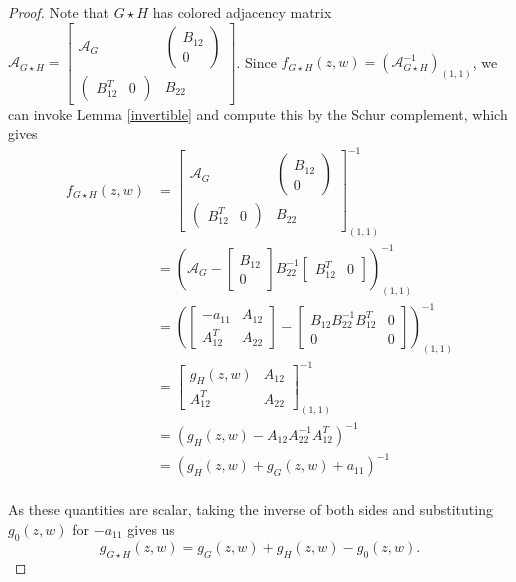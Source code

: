 \documentclass[12pt]{amsart}
\theoremstyle{remark}
\newcommand{\inv}{^{-1}}
\numberwithin{equation}{section}
\newcommand{\cA}{\mathcal{A}}
\begin{document}
\begin{proof}
Note that $G \star H$ has colored adjacency matrix
$\cA_{G \star H} = \begin{bmatrix}
    \cA_G &\begin{pmatrix}
    B_{12}\\
    0
    \end{pmatrix} \\
    \begin{pmatrix}
    B_{12}^T &
    0
    \end{pmatrix} & B_{22}
\end{bmatrix}$.  Since $f_{G \star H}(z,w) = (\cA_{G \star H}^{-1})_{(1,1)}$, we can invoke Lemma \ref{invertible} and compute this by the Schur complement, which gives
\begin{align*}
     f_{G \star H}(z,w)  &= \begin{bmatrix}
    \cA_G &\begin{pmatrix}
    B_{12}\\
    0
    \end{pmatrix} \\
    \begin{pmatrix}
    B_{12}^T &
    0
    \end{pmatrix} & B_{22}
\end{bmatrix}\inv_{(1,1)} \\
&=\left(\cA_G - \begin{bmatrix}
    B_{12}\\0
\end{bmatrix}B_{22}^{-1}\begin{bmatrix}
    B_{12}^T & 0
\end{bmatrix}\right)^{-1}_{(1,1)} \\
&= \left(\begin{bmatrix}
-a_{11} & A_{12} \\
A_{12}^T & A_{22} 
\end{bmatrix} - 
\begin{bmatrix}
    B_{12}B_{22}^{-1}B_{12}^T & 0 \\
    0 & 0
\end{bmatrix}\right)^{-1}_{(1,1)} \\
&= \begin{bmatrix}
     g_{H}(z,w) & A_{12}\\
    A_{12}^T & A_{22}
\end{bmatrix}^{-1}_{(1,1)}\\
&= (g_{H}(z,w) - A_{12}A_{22}^{-1}A_{12}^T)^{-1}\\
&=(g_{H}(z,w) + g_G(z,w) + a_{11})^{-1} \\
\end{align*} 

As these quantities are scalar, taking the inverse of both sides and substituting $g_0(z,w)$ for $-a_{11}$  gives us
\[
    g_{G\star H}(z,w) = g_G(z,w) + g_{H}(z,w) - g_0(z,w).
\]
\end{proof}
\end{document}
